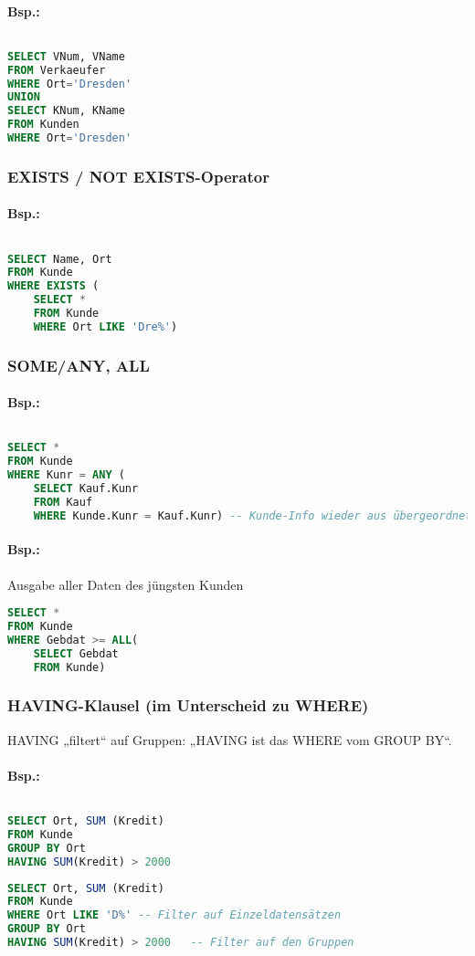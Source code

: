 \paragraph{Bsp.:}$ $
\begin{lstlisting}[language=SQL]
SELECT VNum, VName
FROM Verkaeufer
WHERE Ort='Dresden'
UNION
SELECT KNum, KName
FROM Kunden
WHERE Ort='Dresden'
\end{lstlisting}

\subsubsection{EXISTS / NOT EXISTS-Operator}
\paragraph{Bsp.:} $ $
\begin{lstlisting}[language=SQL]
SELECT Name, Ort
FROM Kunde
WHERE EXISTS (
	SELECT * 
	FROM Kunde
	WHERE Ort LIKE 'Dre%')
\end{lstlisting}
\subsubsection{SOME/ANY, ALL}
\paragraph{Bsp.:}$ $
\begin{lstlisting}[language=SQL]
SELECT *
FROM Kunde
WHERE Kunr = ANY (
	SELECT Kauf.Kunr
	FROM Kauf
	WHERE Kunde.Kunr = Kauf.Kunr) -- Kunde-Info wieder aus übergeordneter Abfrage
\end{lstlisting}
\paragraph{Bsp.:} Ausgabe aller Daten des jüngsten Kunden
\begin{lstlisting}[language=SQL]
SELECT * 
FROM Kunde
WHERE Gebdat >= ALL(
	SELECT Gebdat
	FROM Kunde)
\end{lstlisting}
\subsubsection{HAVING-Klausel (im Unterscheid zu WHERE)}
HAVING „filtert“ auf Gruppen: „HAVING ist das WHERE vom GROUP BY“.
\paragraph{Bsp.:} $ $
\begin{lstlisting}[language=SQL]
SELECT Ort, SUM (Kredit)
FROM Kunde
GROUP BY Ort
HAVING SUM(Kredit) > 2000
\end{lstlisting}
\begin{lstlisting}[language=SQL]
SELECT Ort, SUM (Kredit)
FROM Kunde
WHERE Ort LIKE 'D%'	-- Filter auf Einzeldatensätzen
GROUP BY Ort
HAVING SUM(Kredit) > 2000	-- Filter auf den Gruppen
\end{lstlisting}


